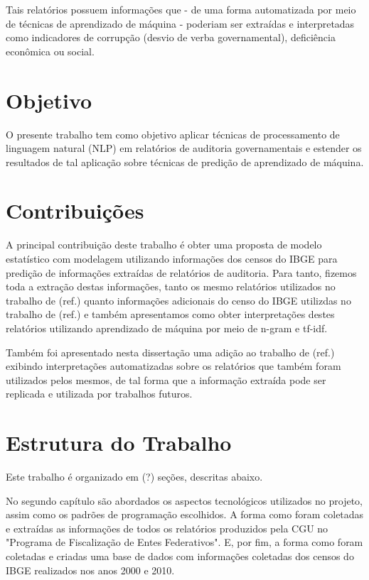 Tais relatórios possuem informações que - de uma forma automatizada por meio de técnicas de aprendizado de máquina - poderiam ser extraídas e interpretadas como indicadores de corrupção (desvio de verba governamental), deficiência econômica ou social.

\section{Objetivo}
\label{sec:objetivo}

O presente trabalho tem como objetivo aplicar técnicas de processamento de linguagem natural (NLP) em relatórios de auditoria governamentais e estender os resultados de tal aplicação sobre técnicas de predição de aprendizado de máquina.

\section{Contribuições}
\label{sec:contribuicoes}

A principal contribuição deste trabalho é obter uma proposta de modelo estatístico com modelagem utilizando informações dos censos do IBGE para predição de informações extraídas de relatórios de auditoria. Para tanto, fizemos toda a extração destas informações, tanto os mesmo relatórios utilizados no trabalho de (ref.) quanto informações adicionais do censo do IBGE utilizdas no trabalho de (ref.) e também apresentamos como obter interpretações destes relatórios utilizando aprendizado de máquina por meio de n-gram e tf-idf.

Também foi apresentado nesta dissertação uma adição ao trabalho de (ref.) exibindo interpretações automatizadas sobre os relatórios que também foram utilizados pelos mesmos, de tal forma que a informação extraída pode ser replicada e utilizada por trabalhos futuros.

\section{Estrutura do Trabalho}
\label{sec:estrutura_do_trabalho}

Este trabalho é organizado em (?) seções, descritas abaixo.

No segundo capítulo são abordados os aspectos tecnológicos utilizados no projeto, assim como os padrões de programação escolhidos. A forma como foram coletadas e extraídas as informações de todos os relatórios produzidos pela CGU no "Programa de Fiscalização de Entes Federativos". E, por fim, a forma como foram coletadas e criadas uma base de dados com informações coletadas dos censos do IBGE realizados nos anos 2000 e 2010.

